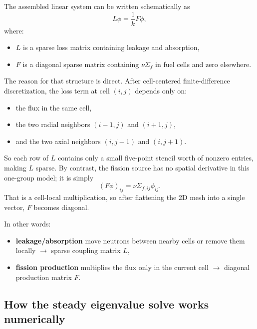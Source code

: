 \documentclass[11pt]{article}
\begin{document}
The assembled linear system can be written schematically as
\[
L\phi = \frac{1}{k}F\phi,
\]
where:
\begin{itemize}
  \item $L$ is a sparse loss matrix containing leakage and absorption,
  \item $F$ is a diagonal sparse matrix containing $\nu\Sigma_f$ in fuel cells
        and zero elsewhere.
\end{itemize}

The reason for that structure is direct.  After cell-centered finite-difference
discretization, the loss term at cell $(i,j)$ depends only on:
\begin{itemize}
  \item the flux in the same cell,
  \item the two radial neighbors $(i-1,j)$ and $(i+1,j)$,
  \item and the two axial neighbors $(i,j-1)$ and $(i,j+1)$.
\end{itemize}

So each row of $L$ contains only a small five-point stencil worth of nonzero
entries, making $L$ sparse.  By contrast, the fission source has no spatial
derivative in this one-group model; it is simply
\[
\left(F\phi\right)_{ij} = \nu\Sigma_{f,ij}\phi_{ij}.
\]
That is a cell-local multiplication, so after flattening the 2D mesh into a
single vector, $F$ becomes diagonal.

In other words:
\begin{itemize}
  \item \textbf{leakage/absorption} move neutrons between nearby cells or remove
        them locally $\rightarrow$ sparse coupling matrix $L$,
  \item \textbf{fission production} multiplies the flux only in the current cell
        $\rightarrow$ diagonal production matrix $F$.
\end{itemize}

\subsection{How the steady eigenvalue solve works numerically}
\end{document}

